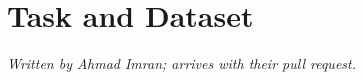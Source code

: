 \section{Task and Dataset}
\label{sec:task}

\emph{Written by Ahmad Imran; arrives with their pull request.}
